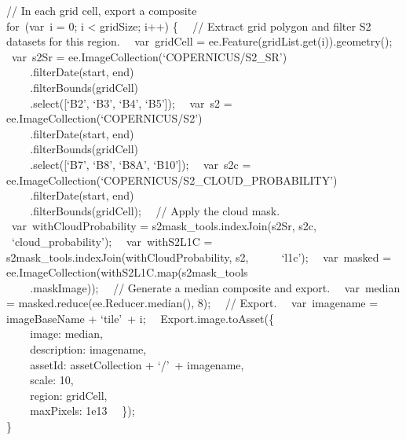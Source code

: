 \documentclass[
  letterpaper,
  DIV=11,
  numbers=noendperiod]{scrreprt}
\begin{document}
// In each grid cell, export a composite\\
for~(var~i = 0; i \textless{} gridSize; i++) \{~ ~// Extract grid
polygon and filter S2 datasets for this region.~ ~var~gridCell =
ee.Feature(gridList.get(i)).geometry();~ ~var~s2Sr =
ee.ImageCollection(`COPERNICUS/S2\_SR')\\
\hspace*{0.333em} ~ ~ ~.filterDate(start, end)\\
\hspace*{0.333em} ~ ~ ~.filterBounds(gridCell)\\
\hspace*{0.333em} ~ ~ ~.select({[}`B2', `B3', `B4', `B5'{]});~ ~var~s2 =
ee.ImageCollection(`COPERNICUS/S2')\\
\hspace*{0.333em} ~ ~ ~.filterDate(start, end)\\
\hspace*{0.333em} ~ ~ ~.filterBounds(gridCell)\\
\hspace*{0.333em} ~ ~ ~.select({[}`B7', `B8', `B8A', `B10'{]});~
~var~s2c = ee.ImageCollection(`COPERNICUS/S2\_CLOUD\_PROBABILITY')\\
\hspace*{0.333em} ~ ~ ~.filterDate(start, end)\\
\hspace*{0.333em} ~ ~ ~.filterBounds(gridCell);~ ~// Apply the cloud
mask.~ ~var~withCloudProbability = s2mask\_tools.indexJoin(s2Sr, s2c,~ ~
~ ~`cloud\_probability');~ ~var~withS2L1C =
s2mask\_tools.indexJoin(withCloudProbability, s2,~ ~ ~ ~`l1c');~
~var~masked = ee.ImageCollection(withS2L1C.map(s2mask\_tools\\
\hspace*{0.333em} ~ ~ ~.maskImage));~ ~// Generate a median composite
and export.~ ~var~median = masked.reduce(ee.Reducer.median(), 8);~ ~//
Export.~ ~var~imagename = imageBaseName + `tile'~+ i;~
~Export.image.toAsset(\{\\
\hspace*{0.333em} ~ ~ ~image: median,\\
\hspace*{0.333em} ~ ~ ~description: imagename,\\
\hspace*{0.333em} ~ ~ ~assetId: assetCollection + `/'~+ imagename,\\
\hspace*{0.333em} ~ ~ ~scale: 10,\\
\hspace*{0.333em} ~ ~ ~region: gridCell,\\
\hspace*{0.333em} ~ ~ ~maxPixels: 1e13~ ~\});\\
\}
\end{document}
